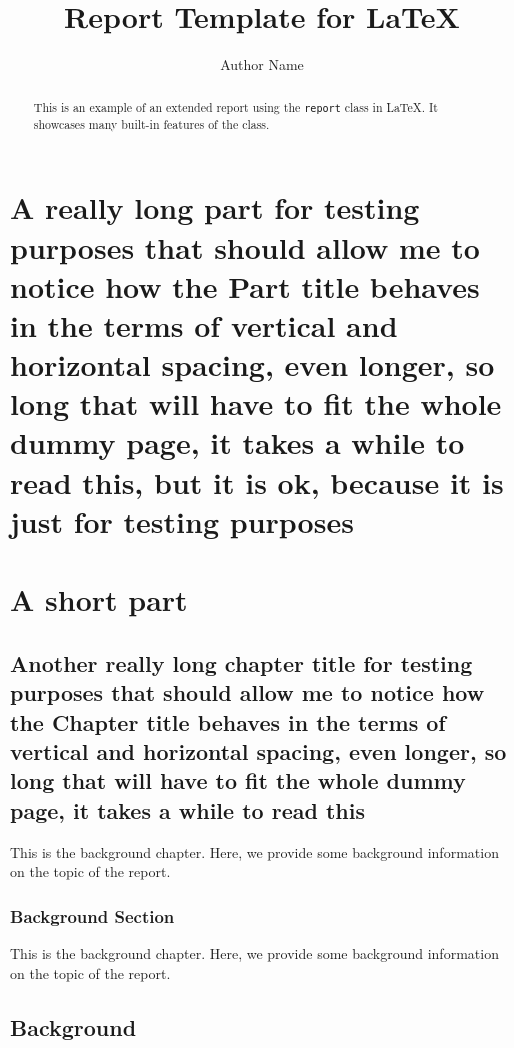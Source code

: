 \documentclass{report}
\title{Report Template for \LaTeX}
\author{Author Name}
\begin{document}
\maketitle

\begin{abstract}
  This is an example of an extended report using the \texttt{report} class in LaTeX. It showcases many built-in features of the class.
\end{abstract}

\tableofcontents

\begin{abstract}
  \lipsum[1-2]
\end{abstract}

\layout%

\part{A really long part for testing purposes that should allow me to notice how the Part title behaves in the terms of vertical and horizontal spacing, even longer, so long that will have to fit the whole dummy page, it takes a while to read this, but it is ok, because it is just for testing purposes}
\part{A short part}

\chapter{Another really long chapter title for testing purposes that should allow me to notice how the Chapter title behaves in the terms of vertical and horizontal spacing, even longer, so long that will have to fit the whole dummy page, it takes a while to read this}
This is the background chapter. Here, we provide some background information on the topic of the report.
\section{Background Section}

This is the background chapter. Here, we provide some background information on
the topic of the report.

\chapter{Background}
\lipsum[1-2]
\end{document}
